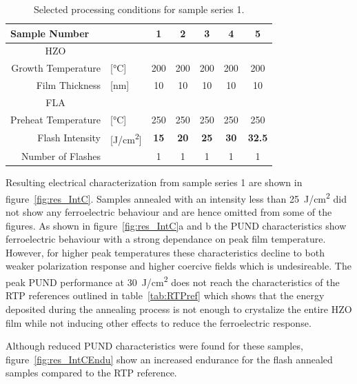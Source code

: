 \documentclass[11pt,twoside]{eitExjobb}
\begin{document}
\begin{table}[htbp]
    \centering
    \caption{Selected processing conditions for sample series 1.}\label{tab:res_IntC}
    \begin{tabular}{rlccccc}
        \toprule
        \multicolumn{2}{l}{Sample Number} & 1 & 2 & 3 & 4 & 5 \\\midrule
        \multicolumn{1}{c}{HZO} & & & & & & \\
        Growth Temperature & [\si{\celsius}] & 200 & 200 & 200 & 200 & 200 \\
        Film Thickness & [\si{\nano\meter}] & 10 & 10 & 10 & 10 & 10 \\\midrule
        \multicolumn{1}{c}{FLA} & & & & & & \\
        Preheat Temperature & [\si{\celsius}] & 250 & 250 & 250 & 250 & 250 \\
        Flash Intensity & [\si{\joule/\centi\meter^2}] & \textbf{15} & \textbf{20} & \textbf{25} & \textbf{30} & \textbf{32.5} \\
        Number of Flashes & & 1 & 1 & 1 & 1 & 1 \\\bottomrule
    \end{tabular}
\end{table}

Resulting electrical characterization from sample series 1 are shown in
figure~\ref{fig:res_IntC}. Samples annealed with an intensity less than
\SI{25}{\joule/\centi\meter^2} did not show any ferroelectric behaviour and are
hence omitted from some of the figures. As shown in
figure~\ref{fig:res_IntC}a and b the PUND characteristics show
ferroelectric behaviour with a strong dependance on peak film temperature.
However, for higher peak temperatures these characteristics decline to both
weaker polarization response and higher coercive fields which is undesireable.
The peak PUND performance at \SI{30}{\joule/\centi\meter^2} does not reach the
characteristics of the RTP references outlined in table~\ref{tab:RTPref} which
shows that the energy deposited during the annealing process is not enough to
crystalize the entire HZO film while not inducing other effects to reduce the
ferroelectric response.

Although reduced PUND characteristics were found for these samples,
figure~\ref{fig:res_IntCEndu} show an increased endurance for the flash
annealed samples compared to the RTP reference.
\end{document}
